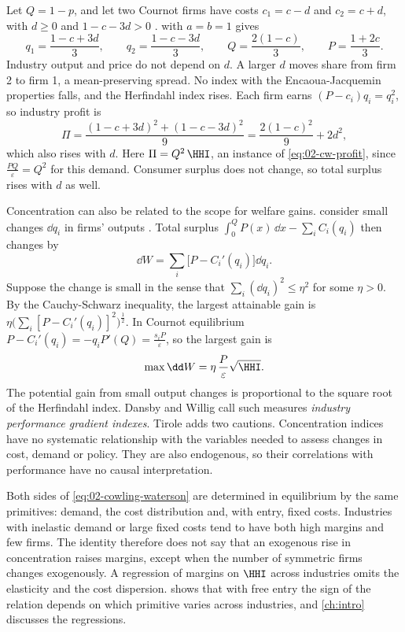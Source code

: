 \begin{example}\label{ex:02-asym}
Let $Q = 1 - p$, and let two Cournot firms have costs $c_1 = c - d$ and $c_2 = c + d$, with $d \ge 0$ and
$1 - c - 3d > 0$ \citep[Exercise~5.7]{Tirole1988}.  with $a = b = 1$ gives
\[
  q_1 = \frac{1 - c + 3d}{3}, \qquad q_2 = \frac{1 - c - 3d}{3}, \qquad Q = \frac{2(1 - c)}{3}, \qquad
  P = \frac{1 + 2c}{3} .
\]
Industry output and price do not depend on $d$. A larger $d$ moves share from firm 2 to firm 1, a mean-preserving
spread. No index with the Encaoua-Jacquemin properties falls, and the Herfindahl index rises. Each firm earns $(P - c_i)q_i = q_i^2$, so
industry profit is
\[
  \Pi = \frac{(1 - c + 3d)^2 + (1 - c - 3d)^2}{9} = \frac{2(1 - c)^2}{9} + 2d^2 ,
\]
which also rises with $d$. Here $\Pi = Q^2\,\HHI$, an instance of \eqref{eq:02-cw-profit}, since
$\frac{PQ}{\varepsilon} = Q^2$ for this demand. Consumer surplus does not change, so total surplus rises with $d$ as
well.
\end{example}

Concentration can also be related to the scope for welfare gains. \citet{DansbyWillig1979} consider small changes
$\dd q_i$ in firms' outputs \citep[Exercise~5.8]{Tirole1988}. Total surplus $\int_0^Q P(x)\,\dd x - \sum_i C_i(q_i)$
then changes by
\[
  \dd W = \sum_i \bigl[P - C_i'(q_i)\bigr]\dd q_i .
\]
Suppose the change is small in the sense that $\sum_i (\dd q_i)^2 \le \eta^2$ for some $\eta > 0$. By the
Cauchy-Schwarz inequality, the largest attainable gain is $\eta\bigl(\sum_i [P - C_i'(q_i)]^2\bigr)^{\frac{1}{2}}$.
In Cournot equilibrium $P - C_i'(q_i) = -q_iP'(Q) = \frac{s_iP}{\varepsilon}$, so the largest gain is
\[
  \max \dd W = \eta\,\frac{P}{\varepsilon}\sqrt{\HHI} .
\]
The potential gain from small output changes is proportional to the square root of the Herfindahl index. Dansby and
Willig call such measures \emph{industry performance gradient indexes}. Tirole adds two cautions. Concentration
indices have no systematic relationship with the variables needed to assess changes in cost, demand or policy. They
are also endogenous, so their correlations with performance have no causal interpretation.

\begin{remark}\label{rem:02-joint}
Both sides of \eqref{eq:02-cowling-waterson} are determined in equilibrium by the same primitives: demand, the cost
distribution and, with entry, fixed costs. Industries with inelastic demand or large fixed costs tend to have both
high margins and few firms. The identity therefore does not say that an exogenous rise in concentration raises
margins, except when the number of symmetric firms changes exogenously. A regression of margins on $\HHI$ across
industries omits the elasticity and the cost dispersion.  shows that with free entry the sign of
the relation depends on which primitive varies across industries, and \cref{ch:intro} discusses the regressions.
\end{remark}

